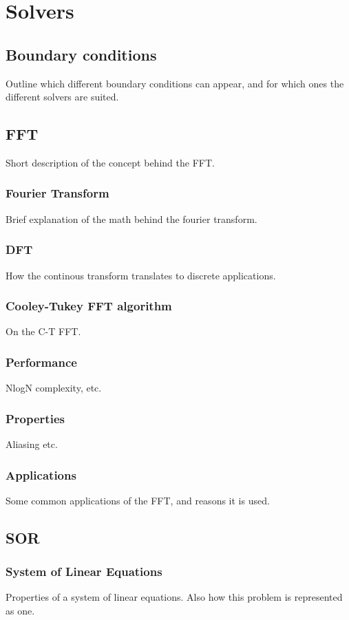 \section{Solvers}
\subsection{Boundary conditions}
Outline which different boundary conditions can appear, and for which ones the
different solvers are suited.

\subsection{FFT}
Short description of the concept behind the FFT.
\subsubsection{Fourier Transform}
Brief explanation of the math behind  the fourier transform.
\subsubsection{DFT}
How the continous transform translates to discrete applications.
\subsubsection{Cooley-Tukey FFT algorithm}
On the C-T FFT.
\subsubsection{Performance}
NlogN complexity, etc.
\subsubsection{Properties}
Aliasing etc.
\subsubsection{Applications}
Some common applications of the FFT, and reasons it is used.

\subsection{SOR}
\subsubsection{System of Linear Equations}
Properties of a system of linear equations. Also how this problem is represented
as one.
